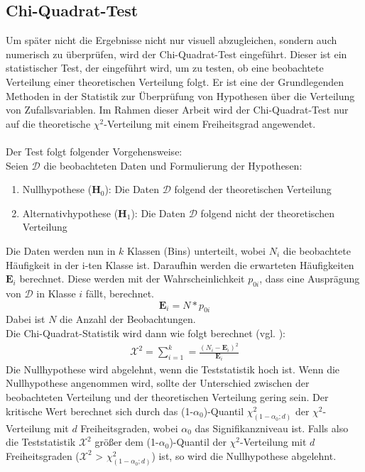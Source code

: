 \documentclass[%
thesis=student,%
coverpage=false,%
titlepage=false,%
headmarks=true, %
german,%
font=libertine, %
math=newpxtx, %
BCOR=5mm,%
coverBCOR=11mm%
]{tumbook}
\theoremstyle{break}
\begin{document}
\subsection{Chi-Quadrat-Test}
Um später nicht die Ergebnisse nicht nur visuell abzugleichen, sondern auch numerisch zu überprüfen, wird der Chi-Quadrat-Test eingeführt. Dieser ist ein statistischer Test, der eingeführt wird, um zu testen, ob eine beobachtete Verteilung einer theoretischen Verteilung folgt. Er ist eine der Grundlegenden Methoden in der Statistik zur Überprüfung von Hypothesen über die Verteilung von Zufallsvariablen. Im Rahmen dieser Arbeit wird der Chi-Quadrat-Test nur auf die theoretische $\chi^2$-Verteilung mit einem Freiheitsgrad angewendet.\\
\\
Der Test folgt folgender Vorgehensweise:\\
Seien $\mathcal{D}$ die beobachteten Daten und 
Formulierung der Hypothesen: 
\begin{enumerate}
	\item Nullhypothese ($\mathbf{H}_0$): Die Daten $\mathcal{D}$ folgend der theoretischen Verteilung\\
	\item Alternativhypothese ($\mathbf{H}_1$): Die Daten $\mathcal{D}$ folgend nicht der theoretischen Verteilung \\
\end{enumerate}
Die Daten werden nun in  $k$ Klassen (Bins) unterteilt, wobei $N_i$ die beobachtete Häufigkeit in der i-ten Klasse ist. Daraufhin werden die erwarteten Häufigkeiten $\mathbf{E}_i$ berechnet. Diese werden mit der Wahrscheinlichkeit $p_{0i}$, dass eine Ausprägung von $\mathcal{D}$ in Klasse $i$ fällt, berechnet. \\
$$ \mathbf{E}_i = N * p_{0i}$$
Dabei ist $N$ die Anzahl der Beobachtungen.\\
Die Chi-Quadrat-Statistik wird dann wie folgt berechnet (vgl. \cite{Chi-Quadrat-Test}):\\
\begin{align}
	\mathcal{X}^2 = \sum_{i=1}^{k} = \frac{(N_i - \mathbf{E}_i)^2}{\mathbf{E}_i} \label{Chi-Quadrat-Test}
\end{align}
Die Nullhypothese wird abgelehnt, wenn die Teststatistik hoch ist. Wenn die Nullhypothese angenommen wird, sollte der Unterschied zwischen der beobachteten Verteilung und der theoretischen Verteilung gering sein. Der kritische Wert berechnet sich durch das (1-$\alpha_0$)-Quantil $\chi^2_{(1-\alpha_0; d)}$ der $\chi^2$-Verteilung mit $d$ Freiheitsgraden, wobei $\alpha_0$ das Signifikanzniveau ist. Falls also die Teststatistik $\mathcal{X}^2$ größer dem (1-$\alpha_0$)-Quantil der $\chi^2$-Verteilung mit $d$ Freiheitsgraden ($\mathcal{X}^2$ > $\chi^2_{(1-\alpha_0; d)}$) ist, so wird die Nullhypothese abgelehnt. 
\end{document}
